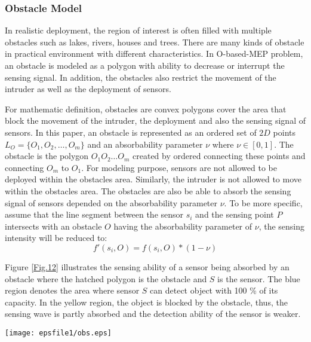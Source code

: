 \documentclass[final]{elsarticle}
\begin{document}
\subsubsection{Obstacle Model}
In realistic deployment, the region of interest is often filled with multiple obstacles such as lakes, rivers, houses and trees. There are many kinds of obstacle in practical environment with different characteristics. In O-based-MEP problem, an obstacle is modeled as a polygon with ability to decrease or interrupt the sensing signal. In addition, the obstacles also restrict the movement of the intruder as well as the deployment of sensors. 

For mathematic definition, obstacles are convex polygons cover the area that block the movement of the intruder, the deployment and also the sensing signal of sensors. In this paper, an obstacle is represented as an ordered set of $2D$ points $ L_O = \{O_1, O_2,\ldots,O_m\}$ and an absorbability parameter $\nu$ where $\nu \in [0,1]$. The obstacle is the polygon $O_1 O_2\ldots O_m $ created by ordered connecting these points and connecting $O_m$ to $O_1$. For modeling purpose, sensors are not allowed to be deployed within the obstacles area. Similarly, the intruder is not allowed to move within the obstacles area. The obstacles are also be able to absorb the sensing signal of sensors depended on the absorbability parameter $\nu$. To be more specific, assume that the line segment between the sensor $s_i$ and the sensing point $ P $ intersects with an obstacle $O$ having the absorbability parameter of $\nu$, the sensing intensity will be reduced to: 
\begin{equation}
\label{eqob}
f'(s_i,O) = f(s_i,O) * (1-\nu) 
\end{equation}

Figure \ref{Fig.12} illustrates the sensing ability of a sensor being absorbed by an obstacle where the hatched polygon is the obstacle and $ S $  is the sensor. The blue region denotes the area where sensor $ S $ can detect object with 100 \% of its capacity. In the yellow region, the object is blocked by the obstacle, thus, the sensing wave is partly absorbed and the detection ability of the sensor is weaker.
\begin{figure*}[h]
	\centering
	\texttt{[image: epsfile1/obs.eps]}
	\caption{Sensing ability of a sensor being absorbed by an obstacle}
	\label{Fig.12}       %
\end{figure*}
\end{document}
